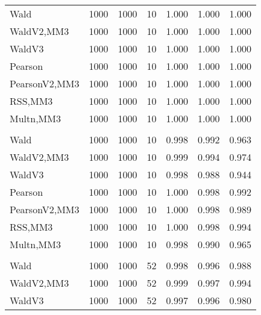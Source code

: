 \documentclass[
]{article}
\begin{document}
\begin{table}[H]
{\begin{tabular}[t]{lrrrrrr}
\hspace{1em}Wald & 1000 & 1000 & 10 & 1.000 & 1.000 & 1.000\\
\hspace{1em}WaldV2,MM3 & 1000 & 1000 & 10 & 1.000 & 1.000 & 1.000\\
\hspace{1em}WaldV3 & 1000 & 1000 & 10 & 1.000 & 1.000 & 1.000\\
\hspace{1em}Pearson & 1000 & 1000 & 10 & 1.000 & 1.000 & 1.000\\
\hspace{1em}PearsonV2,MM3 & 1000 & 1000 & 10 & 1.000 & 1.000 & 1.000\\
\hspace{1em}RSS,MM3 & 1000 & 1000 & 10 & 1.000 & 1.000 & 1.000\\
\hspace{1em}Multn,MM3 & 1000 & 1000 & 10 & 1.000 & 1.000 & 1.000\\
\addlinespace[0.3em]
\multicolumn{7}{l}{\textbf{2F 10V}}\\
\hspace{1em}Wald & 1000 & 1000 & 10 & 0.998 & 0.992 & 0.963\\
\hspace{1em}WaldV2,MM3 & 1000 & 1000 & 10 & 0.999 & 0.994 & 0.974\\
\hspace{1em}WaldV3 & 1000 & 1000 & 10 & 0.998 & 0.988 & 0.944\\
\hspace{1em}Pearson & 1000 & 1000 & 10 & 1.000 & 0.998 & 0.992\\
\hspace{1em}PearsonV2,MM3 & 1000 & 1000 & 10 & 1.000 & 0.998 & 0.989\\
\hspace{1em}RSS,MM3 & 1000 & 1000 & 10 & 1.000 & 0.998 & 0.994\\
\hspace{1em}Multn,MM3 & 1000 & 1000 & 10 & 0.998 & 0.990 & 0.965\\
\addlinespace[0.3em]
\multicolumn{7}{l}{\textbf{3F 15V}}\\
\hspace{1em}Wald & 1000 & 1000 & 52 & 0.998 & 0.996 & 0.988\\
\hspace{1em}WaldV2,MM3 & 1000 & 1000 & 52 & 0.999 & 0.997 & 0.994\\
\hspace{1em}WaldV3 & 1000 & 1000 & 52 & 0.997 & 0.996 & 0.980\\

\end{tabular}}
\end{table}
\end{document}
